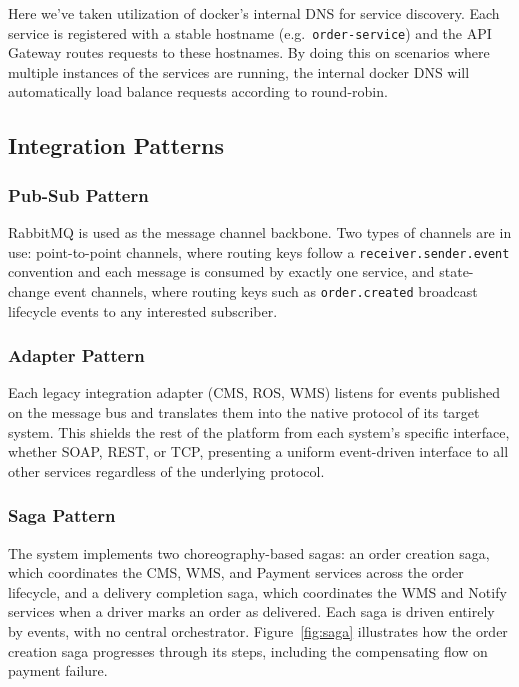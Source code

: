 Here we've taken utilization of docker's internal DNS for service discovery. Each service is registered with a stable hostname (e.g.\ \texttt{order-service}) and the API Gateway routes requests to these hostnames. By doing this on scenarios where multiple instances of the services are running, the internal docker DNS will automatically load balance requests according to round-robin. 

\subsection{Integration Patterns}
\label{subsec:integration_patterns}

\subsubsection{Pub-Sub Pattern}

RabbitMQ is used as the message channel backbone. Two types of channels are in use: point-to-point channels, where routing keys follow a \texttt{receiver.sender.event} convention and each message is consumed by exactly one service, and state-change event channels, where routing keys such as \texttt{order.created} broadcast lifecycle events to any interested subscriber.


\subsubsection{Adapter Pattern}

Each legacy integration adapter (CMS, ROS, WMS) listens for events published on the message bus and translates them into the native protocol of its target system. This shields the rest of the platform from each system's specific interface, whether SOAP, REST, or TCP, presenting a uniform event-driven interface to all other services regardless of the underlying protocol.

\subsubsection{Saga Pattern}

The system implements two choreography-based sagas: an order creation saga, which coordinates the CMS, WMS, and Payment services across the order lifecycle, and a delivery completion saga, which coordinates the WMS and Notify services when a driver marks an order as delivered. Each saga is driven entirely by events, with no central orchestrator. Figure~\ref{fig:saga} illustrates how the order creation saga progresses through its steps, including the compensating flow on payment failure.

